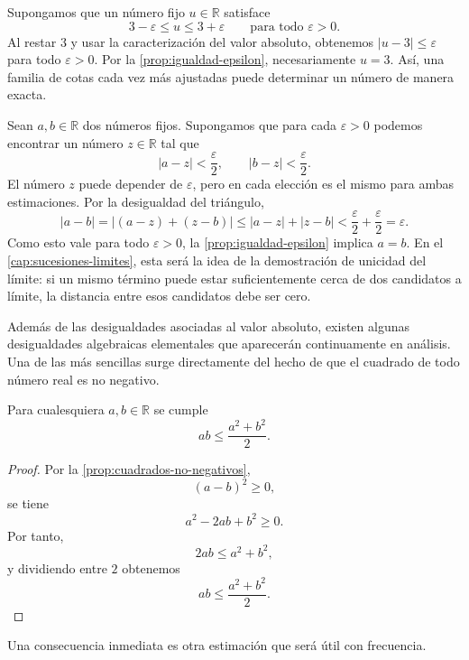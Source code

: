 \begin{example}
Supongamos que un número fijo $u\in\mathbb{R}$ satisface
\[
 3-\varepsilon\leq u\leq3+\varepsilon
 \qquad\text{para todo }\varepsilon>0.
\]
Al restar $3$ y usar la caracterización del valor absoluto, obtenemos $|u-3|\leq\varepsilon$ para todo $\varepsilon>0$. Por la \cref{prop:igualdad-epsilon}, necesariamente $u=3$. Así, una familia de cotas cada vez más ajustadas puede determinar un número de manera exacta.
\end{example}

\begin{example}
Sean $a,b\in\mathbb{R}$ dos números fijos. Supongamos que para cada $\varepsilon>0$ podemos encontrar un número $z\in\mathbb{R}$ tal que
\[
 |a-z|<\frac{\varepsilon}{2},
 \qquad
 |b-z|<\frac{\varepsilon}{2}.
\]
El número $z$ puede depender de $\varepsilon$, pero en cada elección es el mismo para ambas estimaciones. Por la desigualdad del triángulo,
\[
 |a-b|=|(a-z)+(z-b)|
 \leq|a-z|+|z-b|
 <\frac{\varepsilon}{2}+\frac{\varepsilon}{2}
 =\varepsilon.
\]
Como esto vale para todo $\varepsilon>0$, la \cref{prop:igualdad-epsilon} implica $a=b$. En el \cref{cap:sucesiones-limites}, esta será la idea de la demostración de unicidad del límite: si un mismo término puede estar suficientemente cerca de dos candidatos a límite, la distancia entre esos candidatos debe ser cero.
\end{example}

Además de las desigualdades asociadas al valor absoluto, existen algunas desigualdades algebraicas elementales que aparecerán continuamente en análisis. Una de las más sencillas surge directamente del hecho de que el cuadrado de todo número real es no negativo.

\begin{samepage}
\begin{proposition}
\label{prop:producto-cuadrados}
Para cualesquiera $a,b\in\mathbb{R}$ se cumple
\[
ab\leq\frac{a^2+b^2}{2}.
\]
\end{proposition}
\end{samepage}

\begin{proof}
Por la \cref{prop:cuadrados-no-negativos},
\[
(a-b)^2\geq0,
\]
se tiene
\[
a^2-2ab+b^2\geq0.
\]
Por tanto,
\[
2ab\leq a^2+b^2,
\]
y dividiendo entre $2$ obtenemos
\[
ab\leq\frac{a^2+b^2}{2}.
\]
\end{proof}

Una consecuencia inmediata es otra estimación que será útil con frecuencia.

